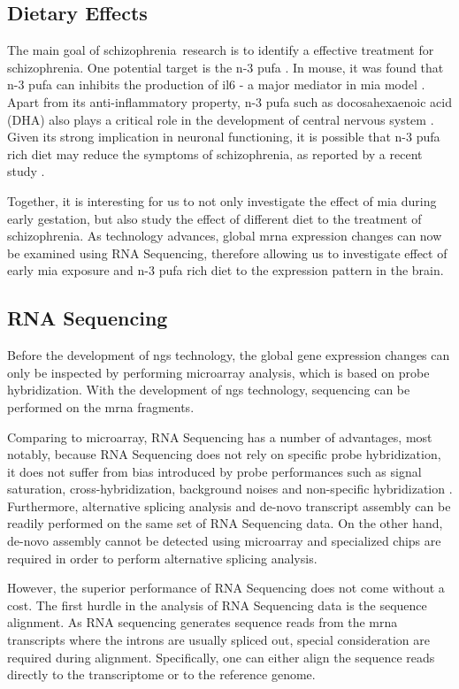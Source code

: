 \documentclass[12pt]{scrbook}
\newcommand*{\scz}{schizophrenia}
\begin{document}
\subsection{Dietary Effects}
The main goal of \scz\ research is to identify a effective treatment for \scz. 
One potential target is the n-3 \gls{pufa} \citep{Li2015,Trebble2003}.
In mouse, it was found that n-3 \gls{pufa} can inhibits the production of \gls{il6} \citep{Trebble2003} - a major mediator in \gls{mia} model \citep{Smith2007}.
Apart from its anti-inflammatory property, n-3 \gls{pufa} such as docosahexaenoic acid (DHA) also plays a critical role in the development of central nervous system \citep{Clandinin1999,Kitajka2002}.
Given its strong implication in neuronal functioning, it is possible that n-3 \gls{pufa} rich diet may reduce the symptoms of \scz, as reported by a recent study \citep{Li2015}.

Together, it is interesting for us to not only investigate the effect of \gls{mia} during early gestation, but also study the effect of different diet to the treatment of \scz.
As technology advances, global \gls{mrna} expression changes can now be examined using RNA Sequencing, therefore allowing us to investigate effect of early \gls{mia} exposure and n-3 \gls{pufa} rich diet to the expression pattern in the brain.

\subsection{RNA Sequencing}
Before the development of \gls{ngs} technology, the global gene expression changes can only be inspected by performing microarray analysis, which is based on probe hybridization.
With the development of \gls{ngs} technology, sequencing can be performed on the \gls{mrna} fragments.

Comparing to microarray, RNA Sequencing has a number of advantages, most notably, because RNA Sequencing does not rely on specific probe hybridization, it does not suffer from bias introduced by probe performances such as signal saturation, cross-hybridization, background noises and non-specific hybridization \citep{Zhao2014}.
Furthermore, alternative splicing analysis and de-novo transcript assembly can be readily performed on the same set of RNA Sequencing data.
On the other hand, de-novo assembly cannot be detected using microarray and specialized chips are required in order to perform alternative splicing analysis. 

However, the superior performance of RNA Sequencing does not come without a cost.
The first hurdle in the analysis of RNA Sequencing data is the sequence alignment.
As RNA sequencing generates sequence reads from the \gls{mrna} transcripts where the introns are usually spliced out, special consideration are required during alignment.
Specifically, one can either align the sequence reads directly to the transcriptome or to the reference genome.
\end{document}
